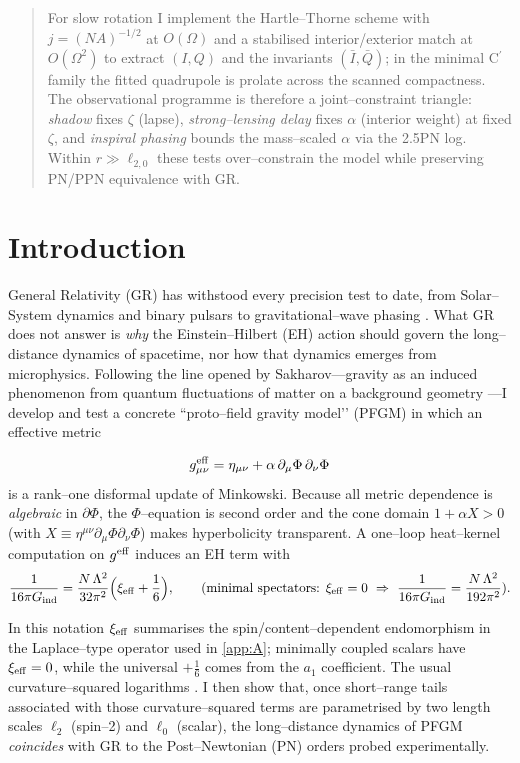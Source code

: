 \documentclass{iopjournal}
\begin{document}
\begin{abstract}
For slow rotation I implement the Hartle–Thorne scheme with $j=(NA)^{-1/2}$ at $O(\Omega)$ and a stabilised interior/exterior match at $O(\Omega^2)$ to extract $(I,Q)$ and the invariants $(\bar I,\bar Q)$; in the minimal C$^\prime$ family the fitted quadrupole is prolate across the scanned compactness. The observational programme is therefore a joint–constraint triangle: \emph{shadow} fixes $\zeta$ (lapse), \emph{strong–lensing delay} fixes $\alpha$ (interior weight) at fixed $\zeta$, and \emph{inspiral phasing} bounds the mass–scaled $\alpha$ via the 2.5PN log. Within $r\gg\ell_{2,0}$ these tests over–constrain the model while preserving PN/PPN equivalence with GR.
\end{abstract}

\section{Introduction}\label{sec:intro}
General Relativity (GR) has withstood every precision test to date, from Solar–System dynamics and binary pulsars to gravitational–wave phasing \cite{Will2014LRR,PoissonWill2014,Blanchet2014LRR}. What GR does not answer is \emph{why} the Einstein–Hilbert (EH) action should govern the long–distance dynamics of spacetime, nor how that dynamics emerges from microphysics. Following the line opened by Sakharov—gravity as an induced phenomenon from quantum fluctuations of matter on a background geometry \cite{Sakharov1967,Visser2002}—I develop and test a concrete ``proto–field gravity model’’ (PFGM) in which an effective metric

\begin{equation}
g^{\rm eff}_{\mu\nu}=\eta_{\mu\nu}+\alpha\,\partial_\mu\Phi\,\partial_\nu\Phi
\label{eqn:01}
\end{equation}
is a rank–one disformal update of Minkowski. Because all metric dependence is \emph{algebraic} in $\partial\Phi$, the $\Phi$–equation is second order and the cone domain $1+\alpha X>0$ (with $X\equiv\eta^{\mu\nu}\partial_\mu\Phi\partial_\nu\Phi$) makes hyperbolicity transparent. A one–loop heat–kernel computation on $g^{\rm eff}$ induces an EH term with 
\begin{equation}
\dfrac{1}{16\pi G_{\rm ind}}=\dfrac{N\,\Lambda^2}{32\pi^2}\Big(\xi_{\rm eff}+\dfrac{1}{6}\Big), 
\qquad
\text{(minimal spectators: } \xi_{\rm eff}=0\ \Rightarrow\ \dfrac{1}{16\pi G_{\rm ind}}=\dfrac{N\,\Lambda^2}{192\pi^2}).
\label{eqn:02}
\end{equation}


In this notation $\xi_{\rm eff}$ summarises the spin/content–dependent endomorphism in the Laplace–type operator used in \cref{app:A}; minimally coupled scalars have $\xi_{\rm eff}=0$, while the universal $+\frac{1}{6}$ comes from the $a_1$ coefficient.
The usual curvature–squared logarithms \cite{DeWitt1965,BirrellDavies,ParkerToms,Vassilevich2003,BarvinskyVilkovisky,Donoghue1994}. I then show that, once short–range tails associated with those curvature–squared terms are parametrised by two length scales $\ell_{2}$ (spin–2) and $\ell_{0}$ (scalar), the long–distance dynamics of PFGM \emph{coincides} with GR to the Post–Newtonian (PN) orders probed experimentally.
\end{document}
